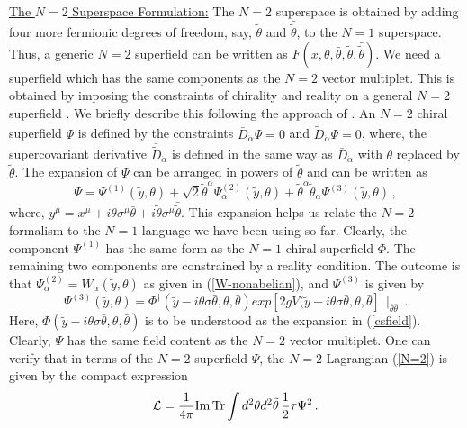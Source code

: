\noindent\underline{The $N=2$ Superspace Formulation:}
The $N=2$ superspace is obtained by adding four more fermionic degrees
of freedom, say, $\tilde\theta$ and $\bar{\tilde\theta}$, 
to the $N=1$ superspace. Thus, a generic $N=2$ superfield can be
written as $F(x,\theta,\bar\theta,\tilde\theta,\bar{\tilde\theta})$. 
We need a superfield which has the same components as the $N=2$ vector
multiplet. This is obtained by imposing the constraints of chirality
and reality on a general $N=2$ superfield \cite{Grimm}. We briefly
describe this following the approach of \cite{bilal}. An $N=2$ chiral
superfield $\Psi$ is defined by the constraints $\bar
D_{\dot\alpha}\Psi=0$ and $\bar{\tilde D}_{\dot\alpha}\Psi=0$, where,
the supercovariant derivative $\bar{\tilde D}_{\dot\alpha}$ is defined
in the same way as $\bar D_{\dot\alpha}$ with $\theta$ replaced by
$\tilde\theta$. The expansion of $\Psi$ can be arranged in powers of
$\tilde\theta$ and can be written as
$$
\Psi=\Psi^{(1)}(\tilde y,\theta)+\sqrt{2}\tilde\theta^\alpha
\Psi^{(2)}_\alpha(\tilde y, \theta) + \tilde\theta^\alpha
\tilde\theta_\alpha \Psi^{(3)}(\tilde y, \theta)\,,
$$
where, $y^\mu =x^\mu +i\theta\sigma^\mu\bar\theta +i\tilde\theta
\sigma^\mu\bar{\tilde\theta}$. This expansion helps us relate the
$N=2$ formalism to the $N=1$ language we have been using so far.
Clearly, the component $\Psi^{(1)}$ has the same form as the $N=1$
chiral superfield $\Phi$. The remaining two components are constrained
by a reality condition. The outcome is that $\Psi^{(2)}_\alpha=
W_\alpha (\tilde y, \theta)$ as given in (\ref{W-nonabelian}), and
$\Psi^{(3)}$ is given by
$$
\Psi^{(3)}(\tilde y,\theta)= \Phi^\dagger(\tilde y-i\theta\sigma 
\bar\theta, \theta,\bar\theta) exp \left[2gV(\tilde y -i\theta\sigma
\bar\theta, \theta,\bar\theta\right]\,\mid_{\bar\theta\bar\theta}\,.
$$
Here, $\Phi(\tilde y -i\theta\sigma\bar\theta,\theta,\bar\theta)$ is
to be understood as the expansion in (\ref{csfield}). Clearly, $\Psi$
has the same field content as the $N=2$ vector multiplet. One can
verify that in terms of the $N=2$ superfield $\Psi$, the $N=2$
Lagrangian (\ref{N=2}) is given by the compact expression
\begin{equation}
{\cal L}= \frac{1}{4\pi}{\rm Im\,Tr}\int d^2\theta d^2\tilde\theta\,
\frac{1}{2}\tau\Psi^2\,.
\label{N=2manifest}
\end{equation}

